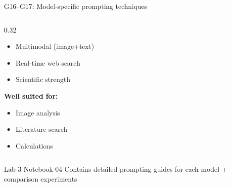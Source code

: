 \documentclass[aspectratio=169, 10pt]{beamer}
\begin{document}
\begin{frame}{G16--G17: Model-specific prompting techniques}
\begin{columns}[T]
\begin{column}{0.32\textwidth}
\begin{itemize}
                \item Multimodal (image+text)
                \item Real-time web search
                \item Scientific strength
            \end{itemize}
            \textbf{Well suited for:}
            \begin{itemize}
                \item Image analysis
                \item Literature search
                \item Calculations
            \end{itemize}
        \end{column}
    \end{columns}
    
    \vspace{0.15cm}
    \begin{block}{\footnotesize Lab 3 Notebook 04}
        \footnotesize Contains detailed prompting guides for each model + comparison experiments
    \end{block}
\end{frame}
\end{document}
